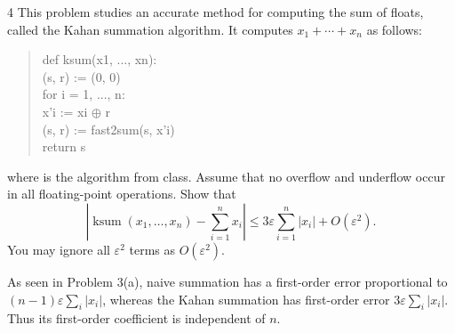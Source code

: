 \documentclass[11pt,oneside]{article}
\begin{document}
\begin{problem}{4}
This problem studies an accurate method for computing the sum of floats,
called the Kahan summation algorithm. It computes
$x_1+\cdots+x_n$ as follows:
\begin{quote}
\small\ttfamily
def ksum(x1, ..., xn):\\
\hspace*{1.5em}(s, r) := (0, 0)\\
\hspace*{1.5em}for i = 1, ..., n:\\
\hspace*{3em}x'i := xi \(\oplus\) r\\
\hspace*{3em}(s, r) := fast2sum(s, x'i)\\
\hspace*{1.5em}return s
\end{quote}
where  is the algorithm from class. Assume that no
overflow and underflow occur in all floating-point operations.
Show that
\[
 \left|\operatorname{ksum}(x_1, \ldots, x_n)
 -\sum_{i=1}^{n}x_i\right|
 \le3\varepsilon\sum_{i=1}^{n}|x_i|+O(\varepsilon^2).
\]
You may ignore all $\varepsilon^2$ terms as $O(\varepsilon^2)$.
\begin{remark}
As seen in Problem 3(a), naive summation has a first-order error
proportional to $(n-1)\varepsilon\sum_i|x_i|$, whereas the Kahan
summation has first-order error $3\varepsilon\sum_i|x_i|$.
Thus its first-order coefficient is independent of $n$.
\end{remark}
\end{problem}
\end{document}
